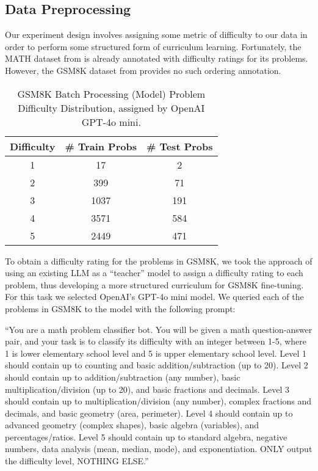 \subsection{Data Preprocessing}

Our experiment design involves assigning some metric of difficulty to our data in order to perform some structured form of curriculum learning. Fortunately, the MATH dataset from \cite{hendrycks2021measuringmathematicalproblemsolving} is already annotated with difficulty ratings for its problems. However, the GSM8K dataset from \cite{cobbe2021trainingverifierssolvemath} provides no such ordering annotation.

\begin{table}[h!]
    \centering
    \begin{tabular}{ccc}
    \toprule
        Difficulty & \# Train Probs & \# Test Probs \\\midrule
        1 & 17 & 2 \\
        2 & 399 & 71 \\
        3 & 1037 & 191 \\
        4 & 3571 & 584 \\
        5 & 2449 & 471 \\\bottomrule
    \end{tabular}
    \caption{GSM8K Batch Processing (Model) Problem Difficulty Distribution, assigned by OpenAI GPT-4o mini.}
    \label{tab:gsm8k_batchprocessing}
\end{table}

To obtain a difficulty rating for the problems in GSM8K, we took the approach of using an existing LLM as a ``teacher'' model to assign a difficulty rating to each problem, thus developing a more structured curriculum for GSM8K fine-tuning. For this task we selected OpenAI's GPT-4o mini model. 
We queried each of the problems in GSM8K to the model with the following prompt:

``You are a math problem classifier bot. You will be given a math question-answer pair, and your task is to classify its difficulty with an integer between 1-5, where 1 is lower elementary school level and 5 is upper elementary school level. Level 1 should contain up to counting and basic addition/subtraction (up to 20). Level 2 should contain up to addition/subtraction (any number), basic multiplication/division (up to 20), and basic fractions and decimals. Level 3 should contain up to multiplication/division (any number), complex fractions and decimals, and basic geometry (area, perimeter). Level 4 should contain up to advanced geometry (complex shapes), basic algebra (variables), and percentages/ratios. Level 5 should contain up to standard algebra, negative numbers, data analysis (mean, median, mode), and exponentiation. ONLY output the difficulty level, NOTHING ELSE.''

